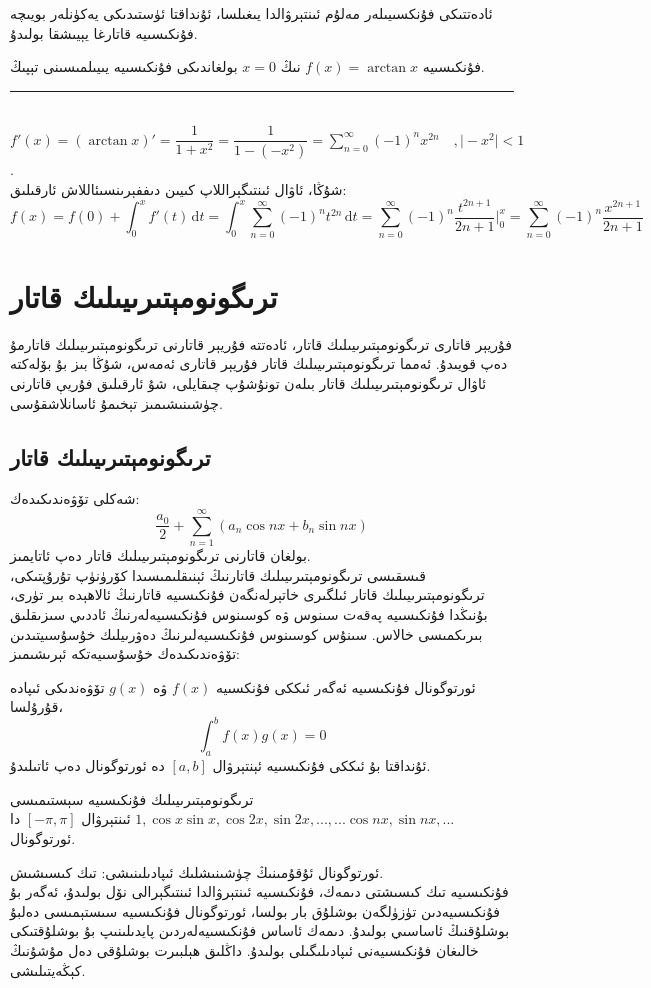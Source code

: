 ئادەتتىكى فۇنكسىيىلەر مەلۇم ئىنتېرۋالدا يىغىلسا، ئۇنداقتا ئۈستىدىكى يەكۈنلەر بويىچە فۇنكىسىيە قاتارغا يېيىشقا بولىدۇ.

\begin{myexample}
	فۇنكىسىيە
	$f(x) = \arctan x$
	نىڭ 
	$x=0$
	بولغاندىكى فۇنكىسىيە يىيىلمىسىنى تېپىڭ.
	\\\rule{\linewidth}{0.05em}\\
	
	$f'(x)=(\arctan x)'=\dfrac{1}{1+x^2}=\dfrac{1}{1-(-x^2)}=\sum\limits_{n=0}^\infty(-1)^nx^{2n} \quad ,\vert-x^2\vert<1$.\\
	شۇڭا، ئاۋال ئىنتىگېراللاپ كىيىن دىففېرىنسىئاللاش ئارقىلىق:\\
	$$f(x)=f(0)+\int_0^xf'(t)\,\textrm{d}t=\int_0^x\sum\limits_{n=0}^\infty(-1)^nt^{2n}\,\textrm{d}t=\sum\limits_{n=0}^\infty(-1)^n\dfrac{t^{2n+1}}{2n+1}\bigg|_0^x=\sum\limits_{n=0}^\infty(-1)^n\dfrac{x^{2n+1}}{2n+1}$$
\end{myexample}

\section{ترىگونومېتىرىيىلىك قاتار}
فۇريېر قاتارى ترىگونومېتىرىيىلىك قاتار، ئادەتتە فۇريېر قاتارنى ترىگونومېتىرىيىلىك قاتارمۇ دەپ قويىدۇ. ئەمما ترىگونومېتىرىيىلىك قاتار فۇريېر قاتارى ئەمەس، شۇڭا بىز بۇ بۆلەكتە ئاۋال ترىگونومېتىرىيىلىك قاتار بىلەن تونۇشۇپ چىقايلى، شۇ ئارقىلىق فۇريې قاتارنى چۈشىنىشىمىز تېخىمۇ ئاسانلاشقۇسى.

\subsection{ترىگونومېتىرىيىلىك قاتار}

 شەكلى تۆۋەندىكىدەك:
$$
\frac{a_0}{2}+\sum_{n=1}^{\infty}(a_n\cos nx + b_n\sin nx)
$$
بولغان قاتارنى ترىگونومېتىرىيىلىك قاتار دەپ ئاتايمىز.\\
قىسقىسى ترىگونومېتىرىيىلىك قاتارنىڭ ئېنىقلىمىسىدا كۆرۈنۈپ تۇرۇپتىكى، ترىگونومېتىرىيىلىك قاتار ئىلگىرى خاتېرلەنگەن فۇنكىسىيە قاتارنىڭ ئالاھېدە بىر تۈرى، بۇنىڭدا فۇنكىسىيە پەقەت سىنوس ۋە كوسىنوس فۇنكىسىيەلەرنىڭ ئاددىي سىزىقلىق بىرىكمىسى خالاس. سىنۇس كوسىنوس فۇنكىسىيەلىرنىڭ دەۋرىيلىك خۇسۇسىيتىدىن تۆۋەندىكىدەك خۇسۇسىيەتكە ئېرىشىمىز:

\begin{MyDefinition}{ئورتوگونال فۇنكىسىيە}{}
	ئەگەر ئىككى فۇنكسىيە $f(x)$ ۋە $g(x)$ تۆۋەندىكى ئىپادە قۇرۇلسا،
	$$
	\int_{a}^{b}f(x)g(x) = 0
	$$
	ئۇنداقتا بۇ ئىككى فۇنكىسىيە ئېنتېرۋال $[a,b]$ دە ئورتوگونال دەپ ئاتىلىدۇ.
\end{MyDefinition}
ترىگونومېتىرىيىلىك فۇنكىسىيە سېستىمىسى
$1,\cos x\sin x, \cos 2x,\sin 2x ,...,...\cos nx,\sin nx,...$
ئىنتېرۋال $[-\pi,\pi]$ دا ئورتوگونال.
\begin{colorful}[yellow]
ئورتوگونال ئۇقۇمىنىڭ چۈشىنىشلىك ئىپادىلىنىشى: تىك كىسىشىش.\\
فۇنكىسىيە تىك كىسىشتى دىمەك، فۇنكىسىيە ئىنتېرۋالدا ئىنتىگېرالى نۆل بولىدۇ، ئەگەر بۇ فۇنكىسىيەدىن تۈزۈلگەن بوشلۇق بار بولسا، ئورتوگونال فۇنكىسىيە سىستېمىسى دەلبۇ بوشلۇقنىڭ ئاساسىي بولىدۇ. دىمەك ئاساس فۇنكىسىيەلەردىن پايدىلىنىپ بۇ بوشلۇقتىكى خالىغان فۇنكىسىيەنى ئىپادىلىگىلى بولىدۇ. داڭلىق ھېلبىرت بوشلۇقى دەل مۇشۇنىڭ كېڭەيتىلىشى.
\end{colorful}

